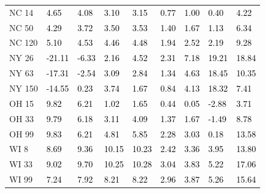 \begin{tabular}{lllllllll}
NC 14 & \textcolor{black}{ 4.65 } & \textcolor{black}{ 4.08 } & \textcolor{black}{ 3.10 } & \textcolor{black}{ 3.15 } & \textcolor{black}{ 0.77 } & \textcolor{black}{ 1.00 } & \textcolor{black}{ 0.40 } & \textcolor{black}{ 4.22 } \\
NC 50 & \textcolor{black}{ 4.29 } & \textcolor{black}{ 3.72 } & \textcolor{black}{ 3.50 } & \textcolor{black}{ 3.53 } & \textcolor{black}{ 1.40 } & \textcolor{black}{ 1.67 } & \textcolor{black}{ 1.13 } & \textcolor{black}{ 6.34 } \\
NC 120 & \textcolor{black}{ 5.10 } & \textcolor{black}{ 4.53 } & \textcolor{black}{ 4.46 } & \textcolor{black}{ 4.48 } & \textcolor{black}{ 1.94 } & \textcolor{black}{ 2.52 } & \textcolor{black}{ 2.19 } & \textcolor{black}{ 9.28 } \\
NY 26 & \textcolor{black}{ -21.11 } & \textcolor{black}{ -6.33 } & \textcolor{black}{ 2.16 } & \textcolor{black}{ 4.52 } & \textcolor{black}{ 2.31 } & \textcolor{black}{ 7.18 } & \textcolor{black}{ 19.21 } & \textcolor{black}{ 18.84 } \\
NY 63 & \textcolor{black}{ -17.31 } & \textcolor{black}{ -2.54 } & \textcolor{black}{ 3.09 } & \textcolor{black}{ 2.84 } & \textcolor{black}{ 1.34 } & \textcolor{black}{ 4.63 } & \textcolor{black}{ 18.45 } & \textcolor{black}{ 10.35 } \\
NY 150 & \textcolor{black}{ -14.55 } & \textcolor{black}{ 0.23 } & \textcolor{black}{ 3.74 } & \textcolor{black}{ 1.67 } & \textcolor{black}{ 0.84 } & \textcolor{black}{ 4.13 } & \textcolor{black}{ 18.32 } & \textcolor{black}{ 7.41 } \\
OH 15 & \textcolor{black}{ 9.82 } & \textcolor{black}{ 6.21 } & \textcolor{black}{ 1.02 } & \textcolor{black}{ 1.65 } & \textcolor{black}{ 0.44 } & \textcolor{black}{ 0.05 } & \textcolor{black}{ -2.88 } & \textcolor{black}{ 3.71 } \\
OH 33 & \textcolor{black}{ 9.79 } & \textcolor{black}{ 6.18 } & \textcolor{black}{ 3.11 } & \textcolor{black}{ 4.09 } & \textcolor{black}{ 1.37 } & \textcolor{black}{ 1.67 } & \textcolor{black}{ -1.49 } & \textcolor{black}{ 8.78 } \\
OH 99 & \textcolor{black}{ 9.83 } & \textcolor{black}{ 6.21 } & \textcolor{black}{ 4.81 } & \textcolor{black}{ 5.85 } & \textcolor{black}{ 2.28 } & \textcolor{black}{ 3.03 } & \textcolor{black}{ 0.18 } & \textcolor{black}{ 13.58 } \\
WI 8 & \textcolor{black}{ 8.69 } & \textcolor{black}{ 9.36 } & \textcolor{black}{ 10.15 } & \textcolor{black}{ 10.23 } & \textcolor{black}{ 2.42 } & \textcolor{black}{ 3.36 } & \textcolor{black}{ 3.95 } & \textcolor{black}{ 13.80 } \\
WI 33 & \textcolor{black}{ 9.02 } & \textcolor{black}{ 9.70 } & \textcolor{black}{ 10.25 } & \textcolor{black}{ 10.28 } & \textcolor{black}{ 3.04 } & \textcolor{black}{ 3.83 } & \textcolor{black}{ 5.22 } & \textcolor{black}{ 17.06 } \\
WI 99 & \textcolor{black}{ 7.24 } & \textcolor{black}{ 7.92 } & \textcolor{black}{ 8.21 } & \textcolor{black}{ 8.22 } & \textcolor{black}{ 2.96 } & \textcolor{black}{ 3.87 } & \textcolor{black}{ 5.26 } & \textcolor{black}{ 15.64 } \\
\bottomrule
\end{tabular}
